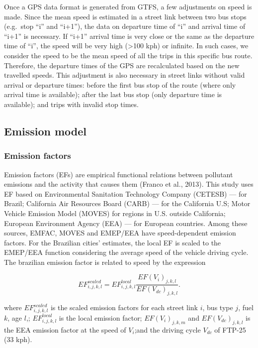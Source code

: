 \documentclass[gc, manuscript]{copernicus}
\begin{document}
Once a GPS data format is generated from GTFS, a few adjustments on
speed is made. Since the mean speed is estimated in a street link
between two bus stops (e.g.~stop ``i'' and ``i+1''), the data on
departure time of ``i'' and arrival time of ``i+1'' is necessary. If
``i+1'' arrival time is very close or the same as the departure time of
``i'', the speed will be very high (\textgreater100 kph) or infinite. In
such cases, we consider the speed to be the mean speed of all the trips
in this specific bus route. Therefore, the departure times of the GPS
are recalculated based on the new travelled speeds. This adjustment is
also necessary in street links without valid arrival or departure times:
before the first bus stop of the route (where only arrival time is
available); after the last bus stop (only departure time is available);
and trips with invalid stop times.

\subsection{Emission model}

\subsubsection{Emission factors}

Emission factors (EFs) are empirical functional relations between
pollutant emissions and the activity that causes them (Franco et al.,
2013). This study uses EF based on Environmental Sanitation Technology
Company (CETESB) --- for Brazil; California Air Resources Board (CARB)
--- for the California U.S; Motor Vehicle Emission Model (MOVES) for
regions in U.S. outside California; European Environment Agency (EEA)
--- for European countries. Among these sources, EMFAC, MOVES and
EMEP/EEA have speed-dependent emission factors. For the Brazilian
cities' estimates, the local EF is scaled to the EMEP/EEA function
considering the average speed of the vehicle driving cycle. The
brazilian emission factor is related to speed by the expression

\begin{equation}
EF^{scaled}_{i,j,k,l}=EF^{local}_{i,j,k,l}\frac{EF(V_i)_{j,k,l}}{EF(V_{dc})_{j,k,l}}.  
\end{equation}

where \(EF_{i,j,k,l}^{scaled}\) is the scaled emission factors for each
street link \(i\), bus type \(j\), fuel \(k\), age \(l\),;
\(EF_{i,j,k,l}^{local}\) is the local emission factor;
\(EF(V_i)_{j,k,m}\) and \(EF(V_{dc})_{j,k,l}\) is the EEA emission
factor at the speed of \(V_i\);and the driving cycle \(V_{dc}\) of
FTP-25 (33 kph).
\end{document}
